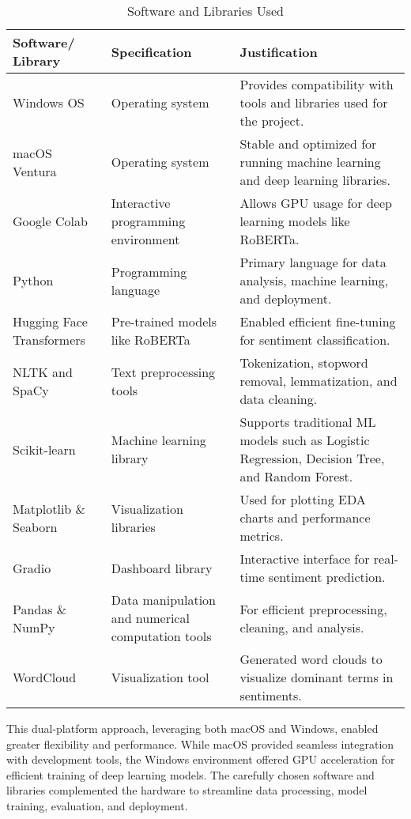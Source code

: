 \documentclass[journal]{IEEEtran}
\begin{document}
\begin{table}[H]
\centering
\begin{tabular}{|p{1.5cm}|p{2cm}|p{4cm}|}
\hline
\textbf{Software/ Library} & \textbf{Specification} & \textbf{Justification} \\ 
\hline
Windows OS & Operating system & Provides compatibility with tools and libraries used for the project. \\ 
\hline
macOS Ventura & Operating system & Stable and optimized for running machine learning and deep learning libraries. \\ 
\hline
Google Colab & Interactive programming environment & Allows GPU usage for deep learning models like RoBERTa. \\ 
\hline
Python & Programming language & Primary language for data analysis, machine learning, and deployment. \\ 
\hline
Hugging Face Transformers & Pre-trained models like RoBERTa & Enabled efficient fine-tuning for sentiment classification. \\ 
\hline
NLTK and SpaCy & Text preprocessing tools & Tokenization, stopword removal, lemmatization, and data cleaning. \\ 
\hline
Scikit-learn & Machine learning library & Supports traditional ML models such as Logistic Regression, Decision Tree, and Random Forest. \\ 
\hline
Matplotlib \& Seaborn & Visualization libraries & Used for plotting EDA charts and performance metrics. \\ 
\hline
Gradio & Dashboard library & Interactive interface for real-time sentiment prediction. \\ 
\hline
Pandas \& NumPy & Data manipulation and numerical computation tools & For efficient preprocessing, cleaning, and analysis. \\ 
\hline
WordCloud & Visualization tool & Generated word clouds to visualize dominant terms in sentiments. \\ 
\hline
\end{tabular}
\caption{Software and Libraries Used}
\label{table:software_libraries}
\end{table}

This dual-platform approach, leveraging both macOS and Windows, enabled greater flexibility and performance. While macOS provided seamless integration with development tools, the Windows environment offered GPU acceleration for efficient training of deep learning models. The carefully chosen software and libraries complemented the hardware to streamline data processing, model training, evaluation, and deployment. 
\end{document}
